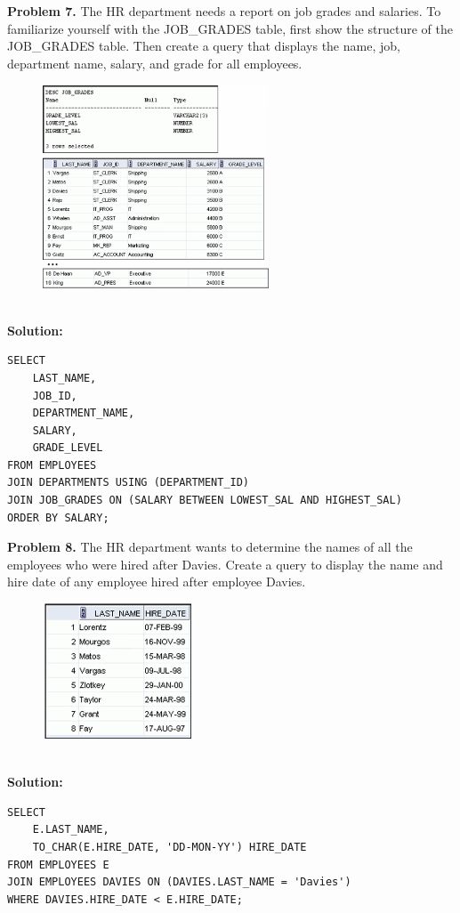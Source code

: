 \documentclass[12pt,a4paper]{article}
\begin{document}
\vspace{0.5cm}

\textbf{Problem 7.} The HR department needs a report on job grades and salaries. To familiarize yourself with the JOB\_GRADES table, first show the structure of the JOB\_GRADES table. Then create a query that displays the name, job, department name, salary, and grade for all employees.
\begin{figure}[htbp]
  \centering
  \includegraphics[width=0.6\textwidth]{Screenshots/67.png}
\end{figure}\\
\textbf{Solution:}
\begin{lstlisting}[style=sqlstyle]
SELECT 
    LAST_NAME,
    JOB_ID,
    DEPARTMENT_NAME,
    SALARY,
    GRADE_LEVEL
FROM EMPLOYEES
JOIN DEPARTMENTS USING (DEPARTMENT_ID)
JOIN JOB_GRADES ON (SALARY BETWEEN LOWEST_SAL AND HIGHEST_SAL)
ORDER BY SALARY;
\end{lstlisting}

\vspace{0.5cm}
\newpage
\textbf{Problem 8.} The HR department wants to determine the names of all the employees who were hired after Davies. Create a query to display the name and hire date of any employee hired after employee Davies.
\begin{figure}[htbp]
  \centering
  \includegraphics[width=0.4\textwidth]{Screenshots/68.png}
\end{figure}\\
\textbf{Solution:}
\begin{lstlisting}[style=sqlstyle]
SELECT 
    E.LAST_NAME,
    TO_CHAR(E.HIRE_DATE, 'DD-MON-YY') HIRE_DATE
FROM EMPLOYEES E
JOIN EMPLOYEES DAVIES ON (DAVIES.LAST_NAME = 'Davies')
WHERE DAVIES.HIRE_DATE < E.HIRE_DATE;
\end{lstlisting}
\end{document}
